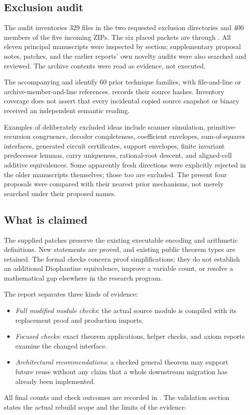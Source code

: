 \subsection{Exclusion audit}

The audit inventories 329 files in the two requested exclusion directories
and 400 members of the five incoming ZIPs. The six placed packets are
 through . All eleven principal
manuscripts were inspected by section; supplementary proposal notes,
patches, and the earlier reports' own novelty audits were also searched and
reviewed. The archive contents were read as evidence, not executed.

The accompanying  and
 identify 60 prior technique families,
with file-and-line or archive-member-and-line references.
 records their source hashes.
Inventory coverage does not assert that every incidental copied source
snapshot or binary received an independent semantic reading.

Examples of deliberately excluded ideas include scanner simulation,
primitive-recursion congruence, decoder completeness, coefficient envelopes,
sum-of-squares interfaces, generated circuit certificates, support envelopes,
finite invariant predecessor lemmas, carry uniqueness, rational-root descent,
and aligned-cell additive equivalences. Some apparently fresh directions
were explicitly rejected in the older manuscripts themselves; those too
are excluded. The present four proposals were compared with their nearest
prior mechanisms, not merely searched under their proposed names.

\subsection{What is claimed}

The supplied patches preserve the existing executable encoding and arithmetic
definitions. New statements are proved, and existing public theorem types
are retained. The formal checks concern proof simplifications; they do not
establish an additional Diophantine equivalence, improve a variable count,
or resolve a mathematical gap elsewhere in the research program.

The report separates three kinds of evidence:
\begin{itemize}
\item \emph{Full modified module checks}: the actual source module is
compiled with its replacement proof and production imports.
\item \emph{Focused checks}: exact theorem applications, helper checks,
and axiom reports examine the changed interface.
\item \emph{Architectural recommendations}: a checked general theorem may
support future reuse without any claim that a whole downstream migration
has already been implemented.
\end{itemize}

All final counts and check outcomes are recorded in
. The validation section states the actual
rebuild scope and the limits of the evidence.

